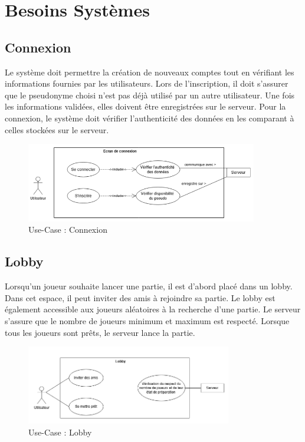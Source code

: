 \documentclass{report}
\begin{document}
\chapter{Besoins Systèmes}
\label{chap:sys_req}

\section{Connexion}

\noindent Le système doit permettre la création de nouveaux comptes tout en vérifiant les informations fournies par les utilisateurs. Lors de l'inscription, il doit s'assurer que le pseudonyme choisi n'est pas déjà utilisé par un autre utilisateur. Une fois les informations validées, elles doivent être enregistrées sur le serveur. Pour la connexion, le système doit vérifier l'authenticité des données en les comparant à celles stockées sur le serveur.

\vspace{-1em}

\begin{figure}[H]
    \centering
     \includegraphics[width=0.9\textwidth, keepaspectratio]{src/sys_req/connexion.png}
    \caption{Use-Case : Connexion}
    \label{fig:use_case_connexion_sys_req}
\end{figure}

\section{Lobby}

\noindent Lorsqu'un joueur souhaite lancer une partie, il est d'abord placé dans un lobby. Dans cet espace, il peut inviter des amis à rejoindre sa partie. Le lobby est également accessible aux joueurs aléatoires à la recherche d'une partie. Le serveur s'assure que le nombre de joueurs minimum et maximum est respecté. Lorsque tous les joueurs sont prêts, le serveur lance la partie.

\vspace{-1em}

\begin{figure}[H]
    \centering
     \includegraphics[width=0.8\textwidth, keepaspectratio]{src/sys_req/lobby.png}
    \caption{Use-Case : Lobby}
    \label{fig:use_case_lobby_sys_req}
\end{figure}
\end{document}
